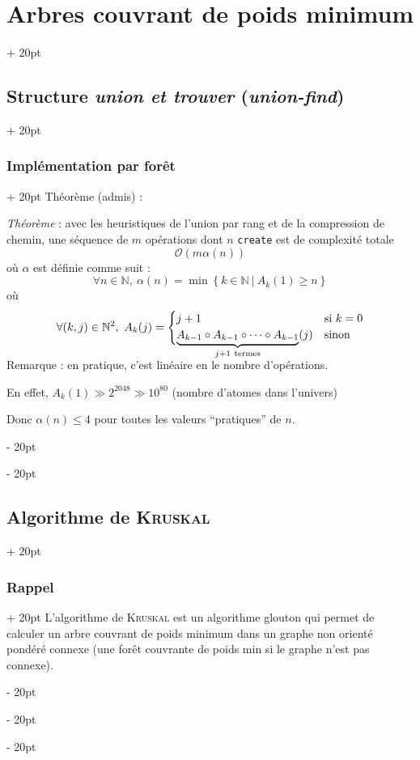 \documentclass[a4paper, 12pt, twoside]{article}
\newcommand{\N}{\mathbb{N}} %
\newcommand{\set}[1]{\left\{ #1 \right\}}
\renewcommand{\le}{\leqslant}
\renewcommand{\ge}{\geqslant}
\newcommand{\ind}[1][20pt]{\advance\leftskip + #1}
\newcommand{\deind}[1][20pt]{\advance\leftskip - #1}
\newenvironment{indt}[2][20pt]{#2 \par \ind[#1]}{\par \deind} %
\begin{document}
\begin{indt}{\section{Arbres couvrant de poids minimum}}
\begin{indt}{\subsection{Structure \textit{union et trouver} (\textit{union-find})}}
\begin{indt}{\subsubsection{Implémentation par forêt}}
                Théorème (admis) :
                \begin{pseudocode}
                    \textit{Théorème} :
                    avec les heuristiques de l'union par rang et de la compression de chemin, une séquence de $m$ opérations dont $n$ \texttt{create} est de complexité totale
                    \[
                        \mathcal O(m \alpha(n))
                    \]
                    où $\alpha$ est définie comme suit :
                    \[
                        \forall n \in \N,\
                        \alpha(n) = \min\set{k \in \N\ |\ A_k(1) \ge n}
                    \]
                    où
                    \[
                        \forall (k, j) \in \N^2,\
                        A_k(j) =
                        \begin{cases}
                            j + 1 & \text{si}\ k = 0
                            \\
                            \underbrace{A_{k - 1} \circ A_{k - 1} \circ \cdots \circ A_{k - 1}}_{j + 1\ \text{termes}}(j)
                                  & \text{sinon}
                            \vspace{-12pt}
                        \end{cases}
                    \]
                    \vspace{6pt}
                \end{pseudocode}

                Remarque : en pratique, c'est linéaire en le nombre d'opérations.

                En effet, $A_k(1) \gg 2^{2048} \gg 10^{80}$ (nombre d'atomes dans l'univers)

                Donc $\alpha(n) \le 4$ pour toutes les valeurs ``pratiques'' de $n$.
            \end{indt}
        \end{indt}

        \vspace{12pt}
        
        \begin{indt}{\subsection{Algorithme de \textsc{Kruskal}}}
            \begin{indt}{\subsubsection{Rappel}}
                L'algorithme de \textsc{Kruskal} est un algorithme glouton qui permet de calculer un arbre couvrant de poids minimum dans un graphe non orienté pondéré connexe (une forêt couvrante de poids min si le graphe n'est pas connexe).


\end{indt}
\end{indt}
\end{indt}
\end{document}
